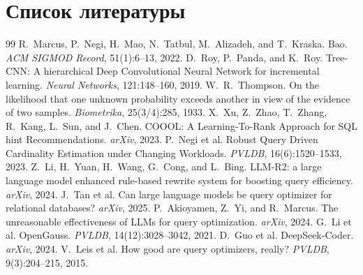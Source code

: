 \section*{Список литературы}
\begin{thebibliography}{99}
 R.~Marcus, P.~Negi, H.~Mao, N.~Tatbul, M.~Alizadeh, and T.~Kraska. Bao. \emph{ACM SIGMOD Record}, 51(1):6--13, 2022.
 D.~Roy, P.~Panda, and K.~Roy. Tree-CNN: A hierarchical Deep Convolutional Neural Network for incremental learning. \emph{Neural Networks}, 121:148--160, 2019.
 W.~R.~Thompson. On the likelihood that one unknown probability exceeds another in view of the evidence of two samples. \emph{Biometrika}, 25(3/4):285, 1933.
 X.~Xu, Z.~Zhao, T.~Zhang, R.~Kang, L.~Sun, and J.~Chen. COOOL: A Learning-To-Rank Approach for SQL hint Recommendations. \emph{arXiv}, 2023.
 P.~Negi et al. Robust Query Driven Cardinality Estimation under Changing Workloads. \emph{PVLDB}, 16(6):1520--1533, 2023.
 Z.~Li, H.~Yuan, H.~Wang, G.~Cong, and L.~Bing. LLM-R2: a large language model enhanced rule-based rewrite system for boosting query efficiency. \emph{arXiv}, 2024.
 J.~Tan et al. Can large language models be query optimizer for relational databases? \emph{arXiv}, 2025.
 P.~Akioyamen, Z.~Yi, and R.~Marcus. The unreasonable effectiveness of LLMs for query optimization. \emph{arXiv}, 2024.
 G.~Li et al. OpenGauss. \emph{PVLDB}, 14(12):3028--3042, 2021.
 D.~Guo et al. DeepSeek-Coder. \emph{arXiv}, 2024.
 V.~Leis et al. How good are query optimizers, really? \emph{PVLDB}, 9(3):204--215, 2015.
\end{thebibliography}

